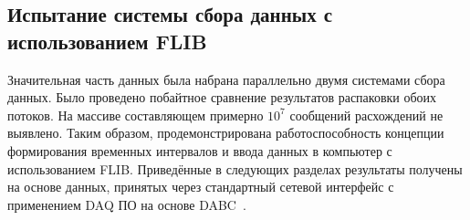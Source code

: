 \subsection{Испытание системы сбора данных с использованием FLIB}\label{section:flib}

Значительная часть данных была набрана параллельно двумя системами сбора данных. Было проведено побайтное сравнение результатов распаковки обоих потоков. На массиве составляющем примерно $ 10^{7} $ сообщений расхождений не выявлено. Таким образом, продемонстрирована работоспособность концепции формирования временных интервалов и ввода данных в компьютер с использованием FLIB. Приведённые в следующих разделах результаты получены на основе данных, принятых через стандартный сетевой интерфейс с применением DAQ ПО на основе DABC~\cite{DABC}.